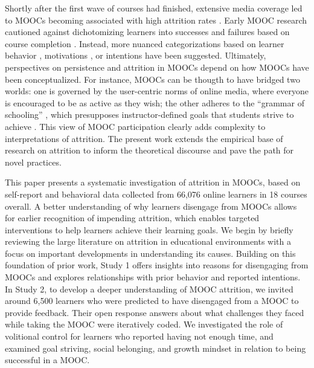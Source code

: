 \documentclass{sigchi}\usepackage[]{graphicx}\usepackage[]{color}
\begin{document}
Shortly after the first wave of courses had finished, extensive media coverage led to MOOCs becoming associated with high attrition rates \cite{lewin2013after,parr2013mooc}. Early MOOC research cautioned against dichotomizing learners into successes and failures based on course completion \cite{kizilcec2013deconstructing,rivard2013measuring}. Instead, more nuanced categorizations based on learner behavior \cite{kizilcec2013deconstructing,clow2013moocs}, motivations \cite{kizilcec2015motivation}, or intentions \cite{wilkowski2014student} have been suggested. Ultimately, perspectives on persistence and attrition in MOOCs depend on how MOOCs have been conceptualized. For instance, MOOCs can be thougth to have bridged two worlds: one is governed by the user-centric norms of online media, where everyone is encouraged to be as active as they wish; the other adheres to the ``grammar of schooling'' \cite{tyack1994grammar}, which presupposes instructor-defined goals that students strive to achieve \cite{kizilcec2015motivation}. This view of MOOC participation clearly adds complexity to interpretations of attrition. The present work extends the empirical base of research on attrition to inform the theoretical discourse and pave the path for novel practices.

This paper presents a systematic investigation of attrition in MOOCs, based on self-report and behavioral data collected from 66,076 online learners in 18 courses overall. A better understanding of why learners disengage from MOOCs allows for earlier recognition of impending attrition, which enables targeted interventions to help learners achieve their learning goals. We begin by briefly reviewing the large literature on attrition in educational environments with a focus on important developments in understanding its causes. Building on this foundation of prior work, Study 1 offers insights into reasons for disengaging from MOOCs and explores relationships with prior behavior and reported intentions. In Study 2, to develop a deeper understanding of MOOC attrition, we invited around 6,500 learners who were predicted to have disengaged from a MOOC to provide feedback. Their open response answers about what challenges they faced while taking the MOOC were iteratively coded. We investigated the role of volitional control for learners who reported having not enough time, and examined goal striving, social belonging, and growth mindset in relation to being successful in a MOOC.
\end{document}
